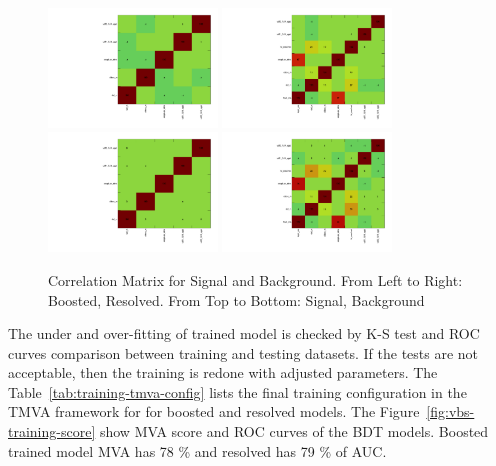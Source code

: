 \begin{figure}[!ht]
  \centering
  \includegraphics[width=0.4\textwidth]{analysis_plots/tmva_plots/zv_BDTG14_CorrelationMatrixS.pdf}
  \includegraphics[width=0.4\textwidth]{analysis_plots/tmva_plots/zjj_BDTG14_CorrelationMatrixS.pdf} \\
  \includegraphics[width=0.4\textwidth]{analysis_plots/tmva_plots/zv_BDTG14_CorrelationMatrixB.pdf}
  \includegraphics[width=0.4\textwidth]{analysis_plots/tmva_plots/zjj_BDTG14_CorrelationMatrixB.pdf} \\
  \caption[Correlation Matrix for Signal and Background]%
  {Correlation Matrix for Signal and Background. From Left to Right: Boosted, Resolved.
    From Top to Bottom: Signal, Background}%
  \label{fig:vbs-training-correlation}
\end{figure}

The under and over-fitting of trained model is checked by \gls{K-S} test
and \gls{ROC} curves comparison between training and testing datasets.
If the tests are not acceptable, then the training is redone with adjusted parameters.
The Table~\ref{tab:training-tmva-config} lists the final
training configuration in the \gls{TMVA} framework for
for boosted and resolved models.
The Figure~\ref{fig:vbs-training-score} show \gls{MVA} score and \gls{ROC} curves
of the BDT models. Boosted trained model \gls{MVA} has 78 \% and resolved
has 79 \% of \gls{AUC}.

